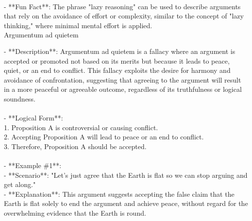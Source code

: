 \documentclass[a4paper,12pt,single,pdftex]{scrbook}
\begin{document}
    
      
    \\

    
      - **Fun Fact**: The phrase "lazy reasoning" can be used to describe arguments that rely on the avoidance of effort or complexity, similar to the concept of "lazy thinking," where minimal mental effort is applied.
    \\

  

Argumentum ad quietem
    
      - **Description**: Argumentum ad quietem is a fallacy where an argument is accepted or promoted not based on its merits but because it leads to peace, quiet, or an end to conflict. This fallacy exploits the desire for harmony and avoidance of confrontation, suggesting that agreeing to the argument will result in a more peaceful or agreeable outcome, regardless of its truthfulness or logical soundness.
    \\

    
      
    \\

    
      - **Logical Form**:
    \\

    
        1. Proposition A is controversial or causing conflict.
    \\

    
        2. Accepting Proposition A will lead to peace or an end to conflict.
    \\

    
        3. Therefore, Proposition A should be accepted.
    \\

    
      
    \\

    
      - **Example \#1**:
    \\

    
        - **Scenario**: "Let's just agree that the Earth is flat so we can stop arguing and get along."
    \\

    
        - **Explanation**: This argument suggests accepting the false claim that the Earth is flat solely to end the argument and achieve peace, without regard for the overwhelming evidence that the Earth is round.
    \\

    
      
\end{document}
